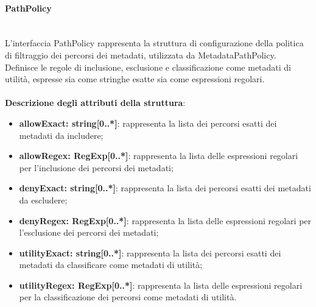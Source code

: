 \documentclass[a4paper,12pt]{article}
\begin{document}
{{{                \paragraph{PathPolicy}\label{par:PathPolicy}\mbox{}\\
                L'interfaccia PathPolicy rappresenta la struttura di configurazione della politica di filtraggio dei percorsi dei metadati, utilizzata da MetadataPathPolicy. Definisce le regole di inclusione, esclusione e classificazione come metadati di utilità, espresse sia come stringhe esatte sia come espressioni regolari.\\
                \\
                \textbf{Descrizione degli attributi della struttura}:
                \begin{itemize}
                    \item \textbf{allowExact: string[0..*]}: rappresenta la lista dei percorsi esatti dei metadati da includere;
                    \item \textbf{allowRegex: RegExp[0..*]}: rappresenta la lista delle espressioni regolari per l'inclusione dei percorsi dei metadati;
                    \item \textbf{denyExact: string[0..*]}: rappresenta la lista dei percorsi esatti dei metadati da escludere;
                    \item \textbf{denyRegex: RegExp[0..*]}: rappresenta la lista delle espressioni regolari per l'esclusione dei percorsi dei metadati;
                    \item \textbf{utilityExact: string[0..*]}: rappresenta la lista dei percorsi esatti dei metadati da classificare come metadati di utilità;
                    \item \textbf{utilityRegex: RegExp[0..*]}: rappresenta la lista delle espressioni regolari per la classificazione dei percorsi come metadati di utilità.
                \end{itemize}
}}}
\end{document}
